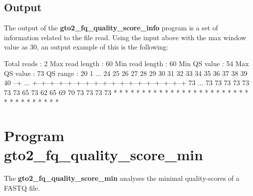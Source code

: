\documentclass[11pt,]{krantz}
\newenvironment{Shaded}{\begin{snugshade}}{\end{snugshade}}
\newcommand{\ExtensionTok}[1]{#1}
\newcommand{\NormalTok}[1]{#1}
\begin{document}
\subsection*{Output}\label{output-14}


The output of the \textbf{gto2\_fq\_quality\_score\_info} program is a
set of information related to the file read. Using the input above with
the max window value as 30, an output example of this is the following:

\begin{Shaded}
\begin{Highlighting}[]
\ExtensionTok{Total}\NormalTok{ reads     : 2}
\ExtensionTok{Max}\NormalTok{ read length : 60}
\ExtensionTok{Min}\NormalTok{ read length : 60}
\ExtensionTok{Min}\NormalTok{ QS value    : 54}
\ExtensionTok{Max}\NormalTok{ QS value    : 73}
\ExtensionTok{QS}\NormalTok{ range        : 20}
 \ExtensionTok{1}\NormalTok{  ...  24 25 26 27 28 29 30 31 32 33 34 35 36 37 38 39 40 }
\ExtensionTok{--+}\NormalTok{ ... +--+--+--+--+--+--+--+--+--+--+--+--+--+--+--+--+--+}
\ExtensionTok{73}\NormalTok{  ...  73 73 73 73 73 73 73 65 73 62 65 69 70 73 73 73 73 }
                               \ExtensionTok{*}\NormalTok{     *  *  *  *             }
                               \ExtensionTok{*}\NormalTok{     *  *  *  *             }
                               \ExtensionTok{*}\NormalTok{     *  *  *  *             }
                               \ExtensionTok{*}\NormalTok{     *  *  *                }
                               \ExtensionTok{*}\NormalTok{     *  *                   }
                               \ExtensionTok{*}\NormalTok{     *  *                   }
                               \ExtensionTok{*}\NormalTok{     *  *                   }
                               \ExtensionTok{*}\NormalTok{     *  *                   }
                                     \ExtensionTok{*}                      
                                     \ExtensionTok{*}                      
                                     \ExtensionTok{*}   
\end{Highlighting}
\end{Shaded}

\section{Program
gto2\_fq\_quality\_score\_min}\label{program-gto2_fq_quality_score_min}

The \textbf{gto2\_fq\_quality\_score\_min} analyses the minimal
quality-scores of a FASTQ file.
\end{document}
